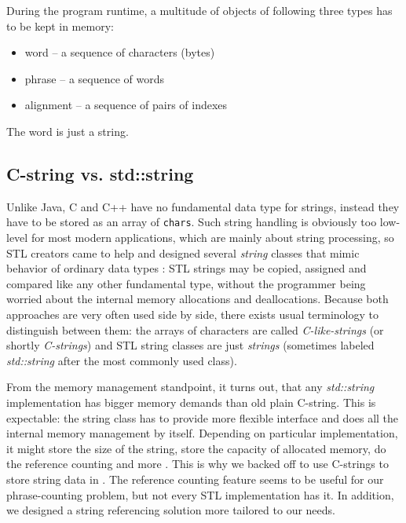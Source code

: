 
During the program runtime, a multitude of objects of following three types has to be
kept in memory:
\begin{itemize}
  \item word -- a sequence of characters (bytes)
  \item phrase -- a sequence of words
  \item alignment -- a sequence of pairs of indexes
\end{itemize}

The word is just a string.

\subsection{C-string vs. std::string}

Unlike Java, C and C++ have no fundamental data type for strings, instead they have to be
stored as an array of \verb|chars|.
Such string handling is obviously too low-level for most modern applications,
which are mainly about string processing, so STL creators came to help and designed several
\emph{string} classes that mimic behavior of ordinary data types \citep[Chapter 11]{josuttis:stl}:
STL strings may be copied, assigned and compared like any other fundamental type,
without the programmer being worried about the internal memory allocations and deallocations.
Because both approaches are very often used side by side, there exists usual terminology to
distinguish between them:
the arrays of characters are called \emph{C-like-strings} (or shortly \emph{C-strings}) and
STL string classes are just \emph{strings} (sometimes labeled \emph{std::string} after the
most commonly used class).

From the memory management standpoint, it turns out, that any \emph{std::string} implementation
has bigger memory demands than old plain C-string.
This is expectable: the string class has to provide more flexible interface and does all
the internal memory management by itself. Depending on particular implementation, it might
store the size of the string, store the capacity of allocated memory, do the reference counting
and more \citep[Item 15]{meyers:effectivestl}.
This is why we backed off to use C-strings to store string data in \eppex{}.
The reference counting feature seems to be useful for our phrase-counting problem,
but not every STL implementation has it.
In addition, we designed a string referencing solution more tailored to our needs.

